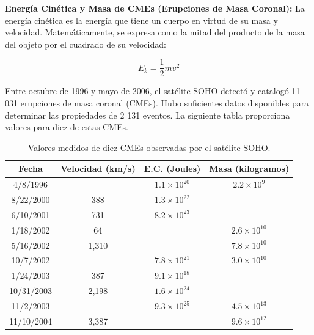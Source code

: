 \documentclass[a4paper]{article}
\newcounter{problema}
\begin{document}
\begin{problema}
\textbf{Energía Cinética y Masa de CMEs (Erupciones de Masa Coronal):} 
La energía cinética es la energía que tiene un cuerpo en virtud de su masa y velocidad. Matemáticamente, se expresa como la mitad del producto de la masa del objeto por el cuadrado de su velocidad:

$$E_k = \frac{1}{2}mv^2$$

Entre octubre de 1996 y mayo de 2006, el satélite SOHO detectó y catalogó 11 031 erupciones de masa coronal (CMEs). Hubo suficientes datos disponibles para determinar las propiedades de 2 131 eventos. La siguiente tabla proporciona valores para diez de estas CMEs.

\begin{table}[H]
    \centering
    \begin{tabular}{|c|c|c|c|}
        \hline
        \textbf{Fecha} & \textbf{Velocidad (km/s)} & \textbf{E.C. (Joules)} & \textbf{Masa (kilogramos)} \\
        \hline
        4/8/1996   &             & \( 1.1 \times 10^{20} \) & \( 2.2 \times 10^9 \) \\
        \hline
        8/22/2000  & 388          & \( 1.3 \times 10^{22} \) & \\
        \hline
        6/10/2001  & 731          & \( 8.2 \times 10^{23} \) & \\
        \hline
        1/18/2002  & 64           &                         & \( 2.6 \times 10^{10} \) \\
        \hline
        5/16/2002  & 1,310        &                         & \( 7.8 \times 10^{10} \) \\
        \hline
        10/7/2002  &              & \( 7.8 \times 10^{21} \) & \( 3.0 \times 10^{10} \) \\
        \hline
        1/24/2003  & 387          & \( 9.1 \times 10^{18} \) & \\
        \hline
        10/31/2003 & 2,198        & \( 1.6 \times 10^{24} \) & \\
        \hline
        11/2/2003  &              & \( 9.3 \times 10^{25} \) & \( 4.5 \times 10^{13} \) \\
        \hline
        11/10/2004 & 3,387        &                         & \( 9.6 \times 10^{12} \) \\
        \hline
    \end{tabular}
    \caption{Valores medidos de diez CMEs observadas por el satélite SOHO.}
    \label{tab:CME_data}
\end{table}



\end{problema}
\end{document}
